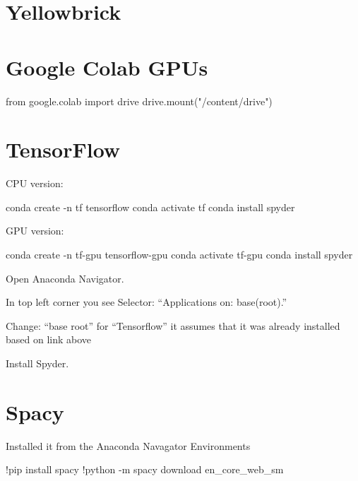 	\section{Yellowbrick}


	\section{Google Colab GPUs}


from google.colab import drive
drive.mount("/content/drive")


	\section{TensorFlow}
\noindent CPU version:
	\begin{code}[\codenumbering]{}
		\codeitemnonumber conda create -n tf tensorflow
		\codeitemnonumber conda activate tf
		\codeitemnonumber conda install spyder
	\end{code}

\noindent GPU version:
	\begin{code}[\codenumbering]{}
		\codeitemnonumber conda create -n tf-gpu tensorflow-gpu
		\codeitemnonumber conda activate tf-gpu
		\codeitemnonumber conda install spyder
	\end{code}

	\begin{numberedlist}
		\item Open Anaconda Navigator.
		\item In top left corner you see Selector: ``Applications on: base(root).''
		\item Change: ``base root'' for ``Tensorflow'' it assumes that it was already installed based on link above
		\item Install Spyder.
	\end{numberedlist}


	\section{Spacy}
Installed it from the Anaconda Navagator Environments
	\begin{code}[\codenumbering]{}
		\codeitemnonumber !pip install spacy
		\codeitemnonumber !python -m spacy download en\_core\_web\_sm
	\end{code}